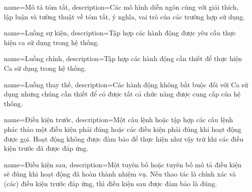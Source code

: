 {
	name={Mô tả tóm tắt},
	description={Các mô hình diễn ngôn cùng với giải thích, lập luận và tường thuật về tóm tắt, ý nghĩa, vai trò của các trường hợp sử dụng.}
}

{
	name={Luồng sự kiện},
	description={Tập hợp các hành động được yêu cầu thực hiện ca sử dụng trong hệ thống.}
}



{
	name={Luồng chính},
	description={Tập hợp các hành động cần thiết để thực hiện Ca sử dụng trong hệ thống.}
}

{
	name={Luồng thay thế},
	description={Các hành động không bắt buộc đối với Ca sử dụng nhưng chúng cần thiết để có được tất cả chức năng được cung cấp của hệ thống.}
}
	
{
	name={Điều kiện trước},
	description={Một câu lệnh hoặc tập hợp các câu lệnh phác thảo một điều kiện phải đúng hoặc các điều kiện phải đúng khi hoạt động được gọi. Hoạt động không được đảm bảo để thực hiện như vậy trừ khi các điều kiện trước đã được đáp ứng.}
}
	
{
	name={Điều kiện sau},
	description={Một tuyên bố hoặc tuyên bố mô tả điều kiện sẽ đúng khi hoạt động đã hoàn thành nhiệm vụ. Nếu thao tác là chính xác và (các) điều kiện trước đáp ứng, thì điều kiện sau được đảm bảo là đúng.}
}

